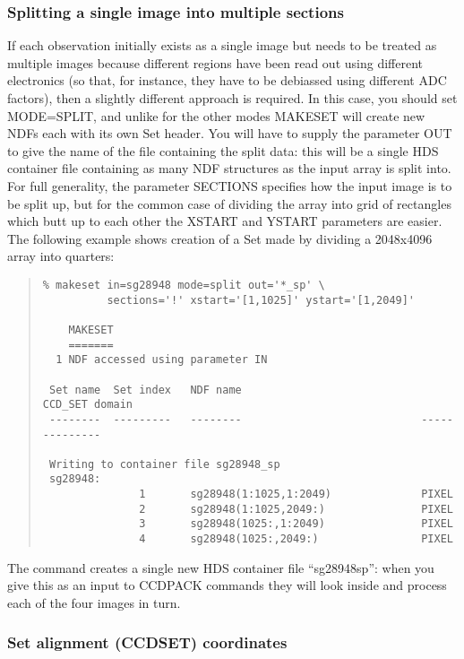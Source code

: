\documentclass[twoside,11pt]{article}
\renewcommand{\_}{\texttt{\symbol{95}}}
\newenvironment{myquote}{\begin{quote}\begin{small}}{\end{small}\end{quote}}
\begin{document}
\subsubsection{\label{makeset_split}Splitting a single image into 
               multiple sections}

If each observation initially exists as a single image 
but needs to be treated as multiple images
because different regions have been read out using different
electronics (so that, for instance, they have to be debiassed using
different ADC factors), then a slightly different approach is required.
In this case, you should set MODE=SPLIT,
and unlike for the other modes MAKESET will create new NDFs each
with its own Set header.  You will have to supply the parameter OUT
to give the name of the file containing the split data:
this will be a single HDS container file containing as many
NDF structures as the input array is split into.
For full generality, the parameter SECTIONS specifies how 
the input image is to be split up, but for the common case of dividing the
array into grid of rectangles which butt up to each other the
XSTART and YSTART parameters are easier.
The following example shows creation of a Set made by dividing 
a 2048x4096 array into quarters:
\begin{myquote}
\begin{verbatim}
% makeset in=sg28948 mode=split out='*_sp' \
          sections='!' xstart='[1,1025]' ystart='[1,2049]'

    MAKESET
    =======
  1 NDF accessed using parameter IN

 Set name  Set index   NDF name                            CCD_SET domain
 --------  ---------   --------                            --------------

 Writing to container file sg28948_sp
 sg28948:
               1       sg28948(1:1025,1:2049)              PIXEL
               2       sg28948(1:1025,2049:)               PIXEL
               3       sg28948(1025:,1:2049)               PIXEL
               4       sg28948(1025:,2049:)                PIXEL
\end{verbatim}
\end{myquote}
The command creates a single new HDS container file ``sg28948\_sp'':
when you give this as an input to CCDPACK commands they will look inside 
and process each of the four images in turn.

\subsubsection{\label{ccd_set}Set alignment (CCD\_SET) coordinates}
\end{document}
